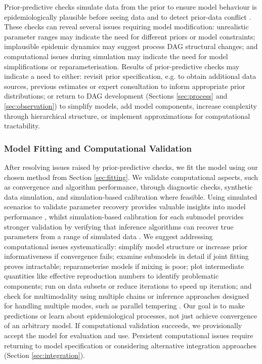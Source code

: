 \documentclass{article}
\begin{document}
Prior-predictive checks simulate data from the prior to ensure model behaviour is epidemiologically plausible before seeing data and to detect prior-data conflict \citep{Box1980,yang2025detecting}.
These checks can reveal several issues requiring model modification: unrealistic parameter ranges may indicate the need for different priors or model constraints; implausible epidemic dynamics may suggest process \ac{DAG} structural changes; and computational issues during simulation may indicate the need for model simplifications or reparameterisation.
Results of prior-predictive checks may indicate a need to either: revisit prior specification, e.g. to obtain additional data sources, previous estimates or expert consultation to inform appropriate prior distributions; or return to \ac{DAG} development (Sections \ref{sec:process} and \ref{sec:observation}) to simplify models, add model components, increase complexity through hierarchical structure, or implement approximations for computational tractability.

\subsubsection{Model Fitting and Computational Validation}

After resolving issues raised by prior-predictive checks, we fit the model using our chosen method from Section \ref{sec:fitting}. We validate computational aspects, such as convergence and algorithm performance, through diagnostic checks, synthetic data simulation, and simulation-based calibration where feasible.
Using simulated scenarios to validate parameter recovery provides valuable insights into model performance \citep{bouman2024bayesian}, whilst simulation-based calibration for each submodel provides stronger validation by verifying that inference algorithms can recover true parameters from a range of simulated data \citep{talts2018validating}.
We suggest addressing computational issues systematically: simplify model structure or increase prior informativeness if convergence fails; examine submodels in detail if joint fitting proves intractable; reparameterise models if mixing is poor; plot intermediate quantities like effective reproduction numbers to identify problematic components; run on data subsets or reduce iterations to speed up iteration; and check for multimodality using multiple chains or inference approaches designed for handling multiple modes, such as parallel tempering \citep{gelman2020bayesian}.
Our goal is to make predictions or learn about epidemiological processes, not just achieve convergence of an arbitrary model. 
If computational validation succeeds, we provisionally accept the model for evaluation and use.
Persistent computational issues require returning to model specification or considering alternative integration approaches (Section \ref{sec:integration}).
\end{document}
